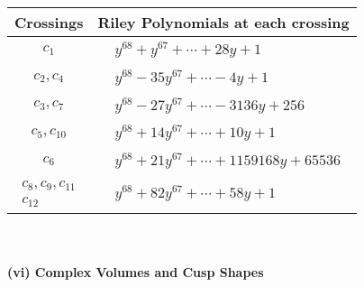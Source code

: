 \documentclass[1p]{elsarticle_modified}
\theoremstyle{definition}
\begin{document}
\begin{tabular}{m{50pt}|m{274pt}}
Crossings & \hspace{64pt}Riley Polynomials at each crossing \\
\hline $$\begin{aligned}c_{1}\end{aligned}$$&$\begin{aligned}
&y^{68}+y^{67}+\cdots+28 y+1
\end{aligned}$\\
\hline $$\begin{aligned}c_{2},c_{4}\end{aligned}$$&$\begin{aligned}
&y^{68}-35 y^{67}+\cdots-4 y+1
\end{aligned}$\\
\hline $$\begin{aligned}c_{3},c_{7}\end{aligned}$$&$\begin{aligned}
&y^{68}-27 y^{67}+\cdots-3136 y+256
\end{aligned}$\\
\hline $$\begin{aligned}c_{5},c_{10}\end{aligned}$$&$\begin{aligned}
&y^{68}+14 y^{67}+\cdots+10 y+1
\end{aligned}$\\
\hline $$\begin{aligned}c_{6}\end{aligned}$$&$\begin{aligned}
&y^{68}+21 y^{67}+\cdots+1159168 y+65536
\end{aligned}$\\
\hline $$\begin{aligned}c_{8},c_{9},c_{11}\\c_{12}\end{aligned}$$&$\begin{aligned}
&y^{68}+82 y^{67}+\cdots+58 y+1
\end{aligned}$\\
\hline
\end{tabular}\\~\\
\newpage\flushleft \textbf{(vi) Complex Volumes and Cusp Shapes}
\end{document}
